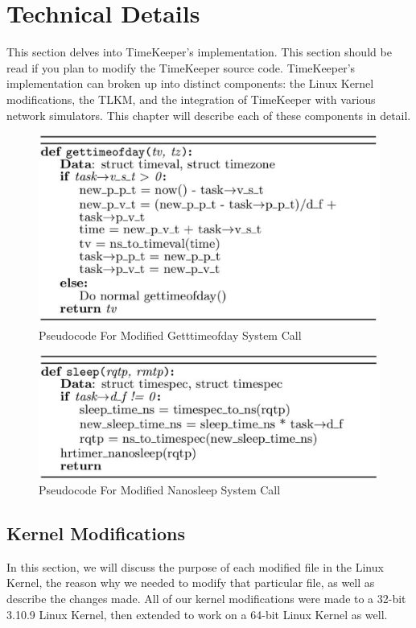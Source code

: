 \chapter{Technical Details} 
\label{chap:implementation}

This section delves into TimeKeeper's implementation. This section should be read if you plan to modify the TimeKeeper source code. TimeKeeper's implementation can broken up into distinct components: the Linux Kernel modifications, the TLKM, and the integration of TimeKeeper with various network simulators. This chapter will describe each of these components in detail.
\begin{figure}[t] 
      \includegraphics[width=\textwidth]{images/gettimeofday_alg.eps} 
    \caption{Pseudocode For Modified Getttimeofday System Call} 
    \label{fig:gettimeofday_alg} 
  \end{figure} 
\begin{figure}[t] 
      \includegraphics[width=\textwidth]{images/sleep_alg.eps} 
    \caption{Pseudocode For Modified Nanosleep System Call} 
    \label{fig:sleep_alg} 
  \end{figure} 
\section{Kernel Modifications}
\label{sec:kernel_modifications}
In this section, we will discuss the purpose of each modified file in the Linux Kernel, the reason why we needed to modify that particular file, as well as describe the changes made. All of our kernel modifications were made to a 32-bit 3.10.9 Linux Kernel, then extended to work on a 64-bit Linux Kernel as well.
